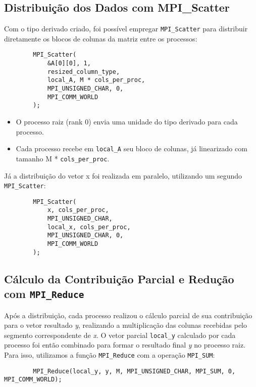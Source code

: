 \documentclass[a4paper, 12pt]{article}
\begin{document}
	\subsection{Distribuição dos Dados com MPI\_Scatter}
	\hspace{0.62cm}Com o tipo derivado criado, foi possível empregar \texttt{MPI\_Scatter} para distribuir diretamente os blocos de colunas da matriz entre os processos:
	
	\begin{verbatim}
		MPI_Scatter(
		    &A[0][0], 1,
		    resized_column_type,
		    local_A, M * cols_per_proc,
		    MPI_UNSIGNED_CHAR, 0,
		    MPI_COMM_WORLD
		);
	\end{verbatim}
	
	\begin{itemize}
		\item O processo raiz (rank 0) envia uma unidade do tipo derivado para cada processo.
		
		\item Cada processo recebe em \texttt{local\_A} seu bloco de colunas, já linearizado com tamanho M * \texttt{cols\_per\_proc}.
	\end{itemize}
	
	Já a distribuição do vetor x foi realizada em paralelo, utilizando um segundo \texttt{MPI\_Scatter}:
	
	\begin{verbatim}
		MPI_Scatter(
		    x, cols_per_proc,
		    MPI_UNSIGNED_CHAR,
		    local_x, cols_per_proc,
		    MPI_UNSIGNED_CHAR, 0,
		    MPI_COMM_WORLD
		);		
	\end{verbatim}
	
	\subsection{Cálculo da Contribuição Parcial e Redução com \texttt{MPI\_Reduce}}
	
	\hspace{0.62cm}Após a distribuição, cada processo realizou o cálculo parcial de sua contribuição para o vetor resultado \textit{y}, realizando a multiplicação das colunas recebidas pelo segmento correspondente de \textit{x}. O vetor parcial \texttt{local\_y} calculado por cada processo foi então combinado para formar o resultado final \textit{y} no processo raiz. Para isso, utilizamos a função \texttt{MPI\_Reduce} com a operação \texttt{MPI\_SUM}:
	
	\begin{verbatim}
		MPI_Reduce(local_y, y, M, MPI_UNSIGNED_CHAR, MPI_SUM, 0, MPI_COMM_WORLD);
	\end{verbatim}
	
\end{document}
